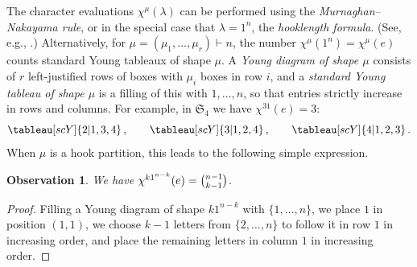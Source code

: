 \documentclass[12pt]{amsart}
\newtheorem{obs}[thm]{Observation}
\numberwithin{equation}{section}
\newcommand{\sn}{\mathfrak{S}_n}
\newcommand{\mfs}[1]{\mathfrak{S}_{#1}}
\begin{document}
The character evaluations $\chi^\mu(\lambda)$ can be performed using
the {\em Murnaghan--Nakayama rule}, 
or in the special case that $\lambda = 1^n$, the
{\em hooklength formula}. (See, e.g., \cite[\S 7.17, \S 7.21]{StanEC2}.)
Alternatively, for
$\mu  = (\mu_1,\dotsc,\mu_r) \vdash n$,
the
number
$\chi^\mu(1^n) = \chi^\mu(e)$
counts
standard Young tableaux of shape $\mu$.
A {\em Young diagram of shape $\mu$} consists
of $r$ left-justified rows of boxes with $\mu_i$ boxes in row $i$,
and a {\em standard Young tableau of shape $\mu$}
is a filling of this 
with $1, \dotsc, n$,
so that entries strictly increase in rows and columns.
For example, in $\mfs 4$ we have
$\chi^{31}(e) = 3$:
\begin{equation*}
  \tableau[scY]{2|1,3,4}\,,
  \qquad \tableau[scY]{3|1,2,4}\,,
  \qquad \tableau[scY]{4|1,2,3}\,.
  \end{equation*}
When $\mu$ is a hook partition, this leads to the following simple expression.
\begin{obs}\label{o:hookchie}
  We have $\chi^{k1^{n-k}}(e) = \tbinom{n-1}{k-1}$.
\end{obs}
\begin{proof}
  Filling a Young diagram of shape $k1^{n-k}$ with $\{1,\dotsc,n\}$,
  we place $1$ in position $(1,1)$, we choose $k-1$ letters from
  $\{2, \dotsc, n\}$
  to follow it in row $1$ in increasing order,
  and place the remaining letters in column $1$ in increasing order.
\end{proof}



\end{document}
